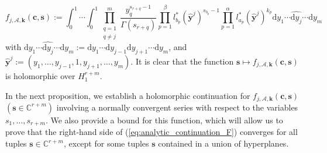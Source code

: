 \documentclass[a4paper]{amsart}
\theoremstyle{remark}
\theoremstyle{definition}
\newcommand{\dd}{\mathrm{d}}
\begin{document}
\begin{equation}
    f_{j,\mathcal{A},\mathbf{k}}(\mathbf{c},\mathbf{s}) := \int_{0}^1 \cdots \int_{0}^1 \prod_{\substack{q=1 \\ q \neq j}}^{m} \frac{y_q^{s_{r+q}-1}}{\Gamma(s_{r+q})} \prod_{p=1}^{\beta} l^*_{b_p}(\widehat{\mathbf{y}}^j)^{s_{b_p}-1} \prod_{p=1}^{\alpha} l^*_{a_p}(\widehat{\mathbf{y}}^j)^{k_p} \dd y_1 \cdots \widehat{\dd y_j} \cdots  \dd y_{m} \label{eq:def_parameter_integral}
\end{equation}
with $\dd y_1 \cdots \widehat{\dd y_{j}}\cdots \dd y_{m} := \dd y_{1} \cdots \dd y_{j-1} \dd y_{j+1} \cdots \dd y_{m}$, and $\widehat{\mathbf{y}}^j := (y_1,\ldots,y_{j-1},1,y_{j+1},\ldots,y_{m})$. It is clear that the function $\mathbf{s} \mapsto f_{j,\mathcal{A},\mathbf{k}}(\mathbf{c},\mathbf{s})$ is holomorphic over $H_1^{r+m}$.

In the next proposition, we establish a holomorphic continuation for $f_{j,\mathcal{A},\mathbf{k}}(\mathbf{c},\mathbf{s})$ $(\mathbf{s} \in \mathbb{C}^{r+m})$ involving a normally convergent series with respect to the variables $s_1,\ldots,s_{r+m}$. We also provide a bound for this function, which will allow us to prove that the right-hand side of (\ref{eq:analytic_continuation_F}) converges for all tuples $\mathbf{s} \in \mathbb{C}^{r+m}$, except for some tuples $\mathbf{s}$ contained in a union of hyperplanes.
\end{document}
